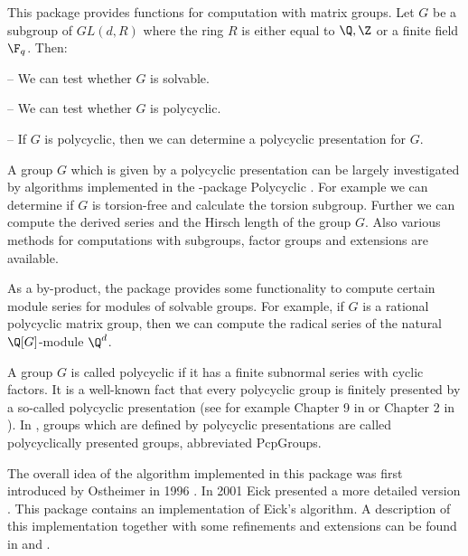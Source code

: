 


This package provides functions for computation with matrix
groups. Let $G$ be a subgroup of $GL(d,R)$ where the ring $R$ is
either equal to $\Q,\Z$ or a finite field $\F_q$.
Then: 
\beginlist
\item{--} 
    We can test whether $G$ is solvable.
\item{--} 
    We can test whether $G$ is polycyclic.
\item{--}
    If $G$ is polycyclic, then we can determine a polycyclic
    presentation for $G$. 
\endlist

A group $G$ which is given by a polycyclic presentation can be largely
investigated by algorithms implemented in the {\GAP}-package
Polycyclic \cite{Polycyclic}. For example 
we can determine if $G$ is torsion-free
and calculate the torsion subgroup. Further we can compute the derived
series and the Hirsch length of the group $G$. Also various methods for
computations with subgroups, factor groups and extensions are
available.

As a by-product, the {\Polenta} package 
provides some functionality to compute certain module series for
modules of solvable groups. For example, if
$G$ is a rational polycyclic matrix group, then we can compute the 
radical series of the natural
$\Q[G]$-module $\Q^d$.  


A group $G$ is called polycyclic if it has a finite subnormal
series with cyclic 
factors. It is a well-known fact that every polycyclic group is
finitely presented by a so-called polycyclic presentation (see
for example Chapter 9 in \cite{Sims} or Chapter 2 in \cite{Polycyclic} ). 
In {\GAP}, groups which are defined by polycyclic
 presentations are called
polycyclically presented groups, abbreviated PcpGroups.
 
The overall idea of the algorithm implemented in this package was
first introduced 
by Ostheimer in 1996 \cite{Ostheimer}. 
In 2001 Eick presented a more detailed
version \cite{Eick}. This package contains an implementation of Eick's
algorithm. A description of this implementation together with some
refinements and extensions can be
found in \cite{AEi05} and \cite{Assmann}. 







